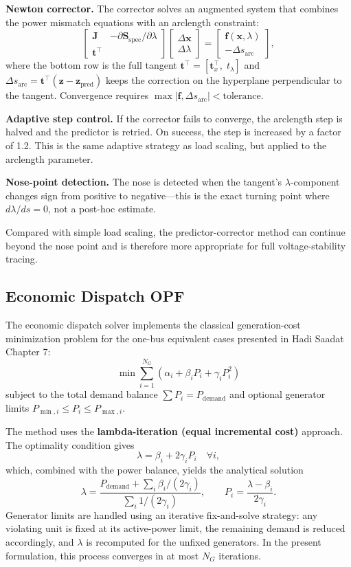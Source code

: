 \documentclass[12pt,a4paper]{article}
\begin{document}
\textbf{Newton corrector.} The corrector solves an augmented system that combines the power mismatch equations with an arclength constraint:
\[
\begin{bmatrix} \mathbf{J} & -\partial\mathbf{S}_{\text{spec}}/\partial\lambda \\ \mathbf{t}^\top \end{bmatrix}
\begin{bmatrix} \Delta\mathbf{x} \\ \Delta\lambda \end{bmatrix}
= \begin{bmatrix} \mathbf{f}(\mathbf{x},\lambda) \\ -\Delta s_{\text{arc}} \end{bmatrix},
\]
where the bottom row is the full tangent $\mathbf{t}^\top = [\mathbf{t}_x^\top,\; t_\lambda]$ and $\Delta s_{\text{arc}} = \mathbf{t}^\top (\mathbf{z} - \mathbf{z}_{\text{pred}})$ keeps the correction on the hyperplane perpendicular to the tangent. Convergence requires $\max|\mathbf{f}, \Delta s_{\text{arc}}| < \text{tolerance}$.

\textbf{Adaptive step control.} If the corrector fails to converge, the arclength step is halved and the predictor is retried. On success, the step is increased by a factor of 1.2. This is the same adaptive strategy as load scaling, but applied to the arclength parameter.

\textbf{Nose-point detection.} The nose is detected when the tangent's $\lambda$-component changes sign from positive to negative---this is the exact turning point where $d\lambda/ds = 0$, not a post-hoc estimate.

Compared with simple load scaling, the predictor-corrector method can continue beyond the nose point and is therefore more appropriate for full voltage-stability tracing.

\subsection{Economic Dispatch OPF}

The economic dispatch solver implements the classical generation-cost minimization problem for the one-bus equivalent cases presented in Hadi Saadat Chapter 7:
\[
\min \sum_{i=1}^{N_G} \left(\alpha_i + \beta_i P_i + \gamma_i P_i^2\right)
\]
subject to the total demand balance $\sum P_i = P_{\text{demand}}$ and optional generator limits $P_{\min,i} \le P_i \le P_{\max,i}$.

The method uses the \textbf{lambda-iteration (equal incremental cost)} approach. The optimality condition gives
\[
\lambda = \beta_i + 2\gamma_i P_i \quad \forall i,
\]
which, combined with the power balance, yields the analytical solution
\[
\lambda = \frac{P_{\text{demand}} + \sum_i \beta_i/(2\gamma_i)}{\sum_i 1/(2\gamma_i)}, \qquad
P_i = \frac{\lambda - \beta_i}{2\gamma_i}.
\]
Generator limits are handled using an iterative fix-and-solve strategy: any violating unit is fixed at its active-power limit, the remaining demand is reduced accordingly, and \(\lambda\) is recomputed for the unfixed generators. In the present formulation, this process converges in at most \(N_G\) iterations.
\end{document}
